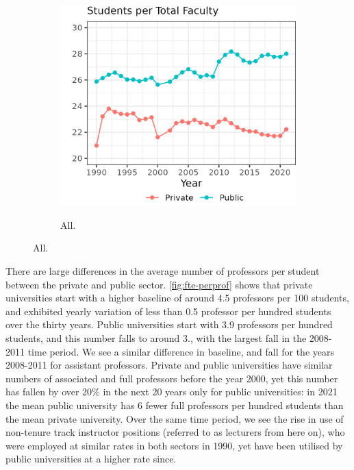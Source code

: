 \begin{figure}[h!]
\begin{subfigure}[b]{0.495\textwidth}
        \centering
        \caption{All.}
        \includegraphics[width=\textwidth]{figures/all-fte-perprof.png}
        \label{fig:all-fte-perprof}
    \end{subfigure}
    \label{fig:fte-perprof}
\end{figure}

There are large differences in the average number of professors per student between the private and public sector.
\autoref{fig:fte-perprof} shows that private universities start with  a higher baseline of around 4.5 professors per 100 students, and exhibited yearly variation of less than 0.5 professor per hundred students over the thirty years.
Public universities start with 3.9 professors per hundred students, and this number falls to around 3., with the largest fall in the 2008-2011 time period.
We see a similar difference in baseline, and fall for the years 2008-2011 for assistant professors.
Private and public universities have similar numbers of associated and full professors before the year 2000, yet this number has fallen by over 20\% in the next 20 years only for public universities: in 2021 the mean public university has 6 fewer full professors per hundred students than the mean private university.
Over the same time period, we see the rise in use of non-tenure track instructor positions (referred to as lecturers from here on), who were employed at similar rates in both sectors in 1990, yet have been utilised by public universities at a higher rate since.

